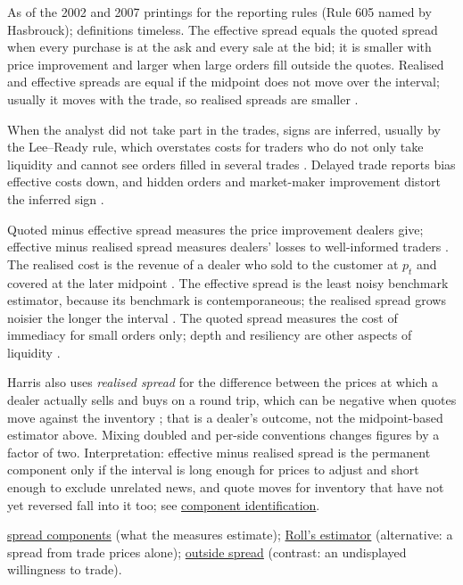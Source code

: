 \begin{qfdefinition}
 As of the 2002 and 2007 printings for the reporting rules (Rule 605 named by Hasbrouck); definitions timeless. The effective spread equals the quoted spread when every purchase is at the ask and every sale at the bid; it is smaller with price improvement and larger when large orders fill outside the quotes. Realised and effective spreads are equal if the midpoint does not move over the interval; usually it moves with the trade, so realised spreads are smaller \citep[same chap., p.~425]{alpha-harris}.

When the analyst did not take part in the trades, signs are inferred, usually by the Lee--Ready rule, which overstates costs for traders who do not only take liquidity and cannot see orders filled in several trades \citep[same chap., p.~423]{alpha-harris}. Delayed trade reports bias effective costs down, and hidden orders and market-maker improvement distort the inferred sign \citep[sec.~14.3.3, pp.~150--151]{s6-hasbrouck}.

 Quoted minus effective spread measures the price improvement dealers give; effective minus realised spread measures dealers' losses to well-informed traders \citep[chap.~``Liquidity and Transaction Cost Measurement'', pp.~425--426]{alpha-harris}. The realised cost is the revenue of a dealer who sold to the customer at $p_t$ and covered at the later midpoint \citep[sec.~14.2.2, p.~148]{s6-hasbrouck}. The effective spread is the least noisy benchmark estimator, because its benchmark is contemporaneous; the realised spread grows noisier the longer the interval \citep[chap.~``Liquidity and Transaction Cost Measurement'', p.~427]{alpha-harris}. The quoted spread measures the cost of immediacy for small orders only; depth and resiliency are other aspects of liquidity \citep[chap.~``Bid/Ask Spreads'', p.~312]{alpha-harris}.

 Harris also uses \emph{realised spread} for the difference between the prices at which a dealer actually sells and buys on a round trip, which can be negative when quotes move against the inventory \citep[chap.~``Dealers'', p.~280]{alpha-harris}; that is a dealer's outcome, not the midpoint-based estimator above. Mixing doubled and per-side conventions changes figures by a factor of two. Interpretation: effective minus realised spread is the permanent component only if the interval is long enough for prices to adjust and short enough to exclude unrelated news, and quote moves for inventory that have not yet reversed fall into it too; see \hyperref[res:spread-component-identification]{component identification}.

 \hyperref[res:adverse-selection-spread-component]{spread components} (what the measures estimate); \hyperref[res:roll-spread-estimator]{Roll's estimator} (alternative: a spread from trade prices alone); \hyperref[def:outside-spread]{outside spread} (contrast: an undisplayed willingness to trade).

\end{qfdefinition}


